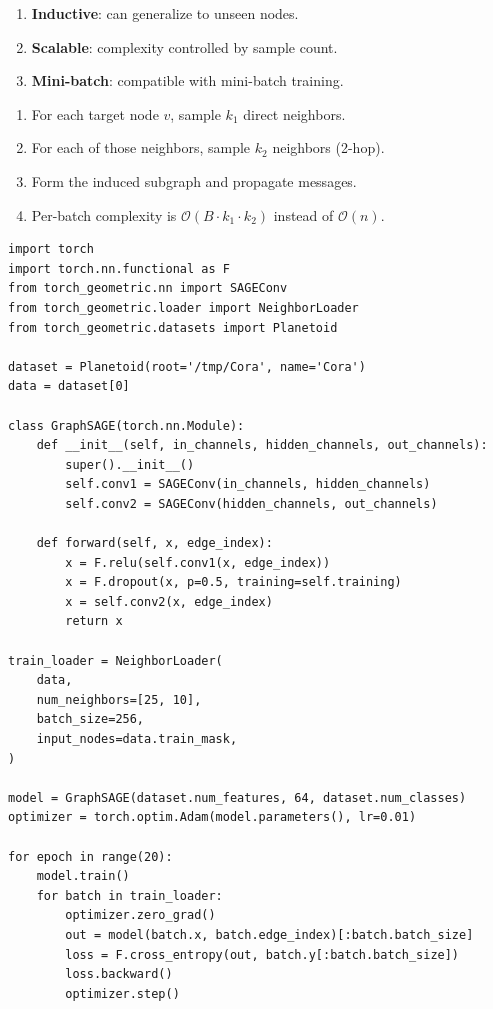 \begin{proposition}
\begin{enumerate}
    \item \textbf{Inductive}: can generalize to unseen nodes.
    \item \textbf{Scalable}: complexity controlled by sample count.
    \item \textbf{Mini-batch}: compatible with mini-batch training.
\end{enumerate}
\end{proposition}

\begin{algorithme}[title=\textbf{Subgraph sampling for GraphSAGE}]
\begin{enumerate}
    \item For each target node $v$, sample $k_1$ direct neighbors.
    \item For each of those neighbors, sample $k_2$ neighbors (2-hop).
    \item Form the induced subgraph and propagate messages.
    \item Per-batch complexity is $\mathcal{O}(B \cdot k_1 \cdot k_2)$
          instead of $\mathcal{O}(n)$.
\end{enumerate}
\end{algorithme}

\begin{codeblock}[title=\textbf{GraphSAGE with neighborhood sampling}]
\begin{verbatim}
import torch
import torch.nn.functional as F
from torch_geometric.nn import SAGEConv
from torch_geometric.loader import NeighborLoader
from torch_geometric.datasets import Planetoid

dataset = Planetoid(root='/tmp/Cora', name='Cora')
data = dataset[0]

class GraphSAGE(torch.nn.Module):
    def __init__(self, in_channels, hidden_channels, out_channels):
        super().__init__()
        self.conv1 = SAGEConv(in_channels, hidden_channels)
        self.conv2 = SAGEConv(hidden_channels, out_channels)

    def forward(self, x, edge_index):
        x = F.relu(self.conv1(x, edge_index))
        x = F.dropout(x, p=0.5, training=self.training)
        x = self.conv2(x, edge_index)
        return x

train_loader = NeighborLoader(
    data,
    num_neighbors=[25, 10],
    batch_size=256,
    input_nodes=data.train_mask,
)

model = GraphSAGE(dataset.num_features, 64, dataset.num_classes)
optimizer = torch.optim.Adam(model.parameters(), lr=0.01)

for epoch in range(20):
    model.train()
    for batch in train_loader:
        optimizer.zero_grad()
        out = model(batch.x, batch.edge_index)[:batch.batch_size]
        loss = F.cross_entropy(out, batch.y[:batch.batch_size])
        loss.backward()
        optimizer.step()
\end{verbatim}
\end{codeblock}

